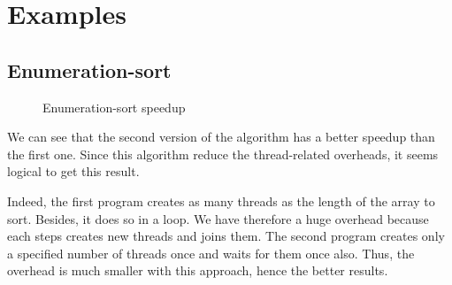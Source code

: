 \chapter{Examples}

\section{Enumeration-sort}

\begin{figure}[H]
  \begin{center}
  \end{center}
  \caption{Enumeration-sort speedup}
  \label{fig:enum_sort}
\end{figure}

We can see that the second version of the algorithm has a better speedup than the first one. Since this algorithm reduce the thread-related overheads, it seems logical to get this result.

Indeed, the first program creates as many threads as the length of the array to sort. Besides, it does so in a loop. We have therefore a huge overhead because each steps creates new threads and joins them. The second program creates only a specified number of threads once and waits for them once also. Thus, the overhead is much smaller with this approach, hence the better results.  
